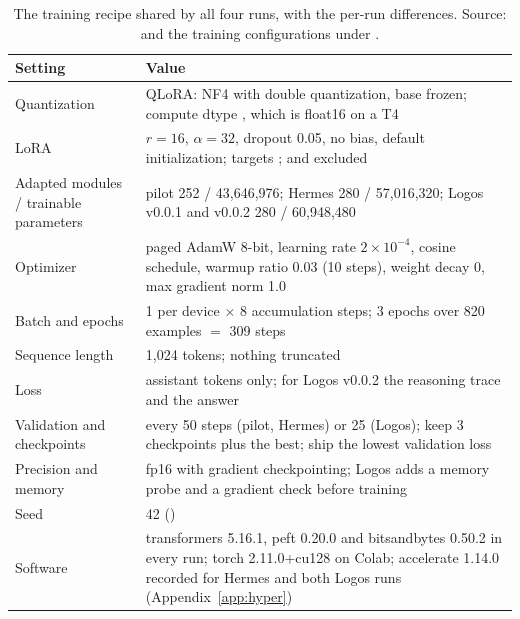 \begin{table}[t]
\centering\small
\caption{The training recipe shared by all four runs, with the per-run differences. Source:  and the training configurations under .}
\label{tab:recipe}
\begin{tabular}{L{44mm}L{112mm}}
\toprule
Setting & Value \\
\midrule
Quantization & QLoRA: NF4 with double quantization, base frozen; compute dtype , which is float16 on a T4 \\
LoRA & $r = 16$, $\alpha = 32$, dropout 0.05, no bias, default initialization; targets ;  and  excluded \\
Adapted modules / trainable parameters & pilot 252 / 43,646,976; Hermes 280 / 57,016,320; Logos v0.0.1 and v0.0.2 280 / 60,948,480 \\
Optimizer & paged AdamW 8-bit, learning rate $2 \times 10^{-4}$, cosine schedule, warmup ratio 0.03 (10 steps), weight decay 0, max gradient norm 1.0 \\
Batch and epochs & 1 per device $\times$ 8 accumulation steps; 3 epochs over 820 examples $=$ 309 steps \\
Sequence length & 1,024 tokens; nothing truncated \\
Loss & assistant tokens only; for Logos v0.0.2 the reasoning trace and the answer \\
Validation and checkpoints & every 50 steps (pilot, Hermes) or 25 (Logos); keep 3 checkpoints plus the best; ship the lowest validation loss \\
Precision and memory & fp16 with gradient checkpointing; Logos adds a memory probe and a gradient check before training \\
Seed & 42 () \\
Software & transformers 5.16.1, peft 0.20.0 and bitsandbytes 0.50.2 in every run; torch 2.11.0+cu128 on Colab; accelerate 1.14.0 recorded for Hermes and both Logos runs (Appendix~\ref{app:hyper}) \\
\bottomrule
\end{tabular}
\end{table}

